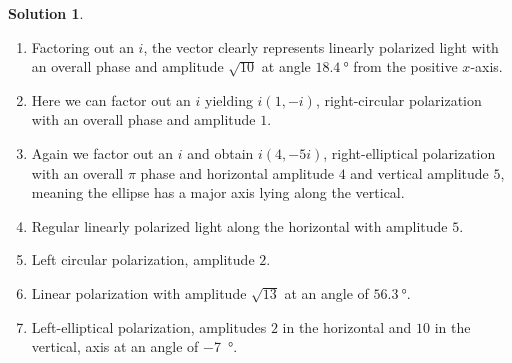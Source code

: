 \documentclass[10pt]{article}
\theoremstyle{definition}
\newtheorem{soln}{Solution}
\begin{document}
\begin{soln}~
  \begin{enumerate}[label=(\alph*)]
    \item Factoring out an $i$, the vector clearly represents linearly polarized light with an overall phase
          and amplitude $\sqrt{10}$ at angle $\qty{18.4}{\degree}$ from the positive $x$-axis.
    \item Here we can factor out an $i$ yielding $i(1,-i)$, right-circular polarization with
          an overall phase and amplitude $1$.
    \item Again we factor out an $i$ and obtain $i(4,-5i)$, right-elliptical polarization with an overall $\pi$ phase and
          horizontal amplitude $4$ and vertical amplitude $5$, meaning the ellipse has a major axis lying along the vertical.
    \item Regular linearly polarized light along the horizontal with amplitude $5$.
    \item Left circular polarization, amplitude $2$.
    \item Linear polarization with amplitude $\sqrt{13}$ at an angle of $\qty{56.3}{\degree}$.
    \item Left-elliptical polarization, amplitudes $2$ in the horizontal and $10$ in the vertical, axis at an angle of
          \qty{-7}{\degree}.
  \end{enumerate}
\end{soln}
\end{document}
